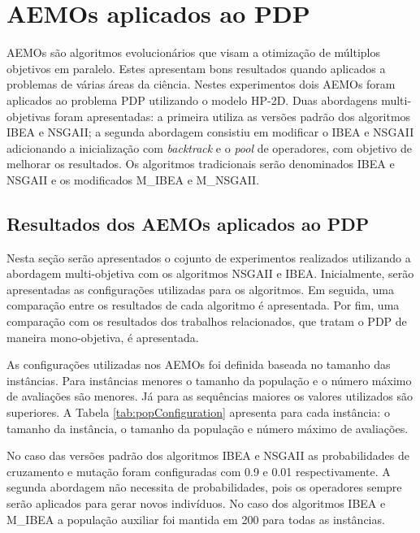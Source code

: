 \section{AEMOs aplicados ao PDP}

AEMOs são algoritmos evolucionários que visam a otimização de múltiplos objetivos em paralelo. Estes apresentam bons resultados quando aplicados a problemas de várias áreas da ciência.  Nestes experimentos dois AEMOs foram aplicados ao problema PDP utilizando o modelo HP-2D. Duas abordagens multi-objetivas foram apresentadas: a primeira utiliza as versões padrão dos algoritmos IBEA e NSGAII; a segunda abordagem consistiu em modificar o IBEA e NSGAII adicionando a inicialização com \textit{backtrack} e o \textit{pool} de operadores, com objetivo de melhorar os resultados. Os algoritmos tradicionais serão denominados IBEA e NSGAII e os modificados M\_IBEA e M\_NSGAII.




\subsection{Resultados dos AEMOs aplicados ao PDP}

Nesta seção serão apresentados o cojunto de experimentos realizados utilizando a abordagem multi-objetiva com os algoritmos NSGAII e IBEA. Inicialmente, serão apresentadas as configurações utilizadas para os algoritmos. Em seguida, uma comparação entre os resultados de cada algoritmo é apresentada. Por fim, uma comparação com os resultados dos trabalhos relacionados, que tratam o PDP de maneira mono-objetiva, é apresentada.

As configurações utilizadas nos AEMOs foi definida baseada no tamanho das instâncias. Para instâncias menores o tamanho da população e o número máximo de avaliações são menores. Já para as sequências maiores os valores utilizados são superiores. A Tabela \ref{tab:popConfiguration} apresenta para cada instância: o tamanho da instância, o tamanho da população e número máximo de avaliações.

No caso das versões padrão dos algoritmos IBEA e NSGAII as probabilidades de cruzamento e mutação foram configuradas com 0.9 e 0.01 respectivamente. A segunda abordagem não necessita de probabilidades, pois os operadores sempre serão aplicados para gerar novos indivíduos. No caso dos algoritmos IBEA e M\_IBEA a população auxiliar foi mantida em 200 para todas as instâncias.

